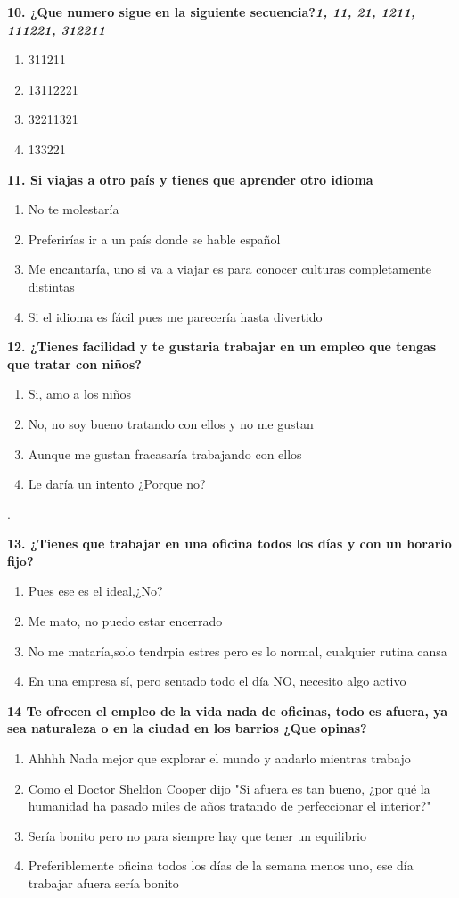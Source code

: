 \documentclass{article}
\begin{document}
\textbf{10. ¿Que numero sigue en la siguiente secuencia?\emph{1, 11, 21, 1211, 111221, 312211} }
\begin{enumerate}[label=(\Alph*)] 
\item 311211
\item 13112221
\item 32211321
\item 133221
\end{enumerate}

\textbf{11. Si viajas a otro país y tienes que aprender otro idioma}
\begin{enumerate}[label=(\Alph*)] 
\item No te molestaría
\item Preferirías ir a un país donde se hable español
\item Me encantaría, uno si va a viajar es para conocer culturas completamente distintas
\item Si el idioma es fácil pues me parecería hasta divertido
\end{enumerate}

\textbf{12. ¿Tienes facilidad y te gustaria trabajar en un empleo que tengas que tratar con niños?}
\begin{enumerate}[label=(\Alph*)]
\item Si, amo a los niños
\item No, no soy bueno tratando con ellos y no me gustan
\item Aunque me gustan fracasaría trabajando con ellos
\item Le daría un intento ¿Porque no?
\end{enumerate}.  

\textbf{13. ¿Tienes que trabajar en una oficina todos los días y con un horario fijo?}
\begin{enumerate}[label=(\Alph*)] 
\item Pues ese es el ideal,¿No?
\item Me mato, no puedo estar encerrado
\item No me mataría,solo tendrpia estres pero es lo normal, cualquier rutina cansa
\item En una empresa sí, pero sentado todo el día NO, necesito algo activo 
\end{enumerate}
\textbf{14 Te ofrecen el empleo de la vida nada de oficinas, todo es afuera, ya sea naturaleza o en la ciudad en los barrios ¿Que opinas?}
\begin{enumerate}[label=(\Alph*)] 
\item Ahhhh Nada mejor que explorar el mundo y andarlo mientras trabajo 
\item Como el Doctor Sheldon Cooper dijo "Si afuera es tan bueno, ¿por qué la humanidad ha pasado miles de años tratando de perfeccionar  el interior?"
\item Sería bonito pero no para siempre hay que tener un equilibrio
\item Preferiblemente oficina todos los días de la semana menos uno, ese día trabajar afuera sería bonito
\end{enumerate} 
\end{document}
